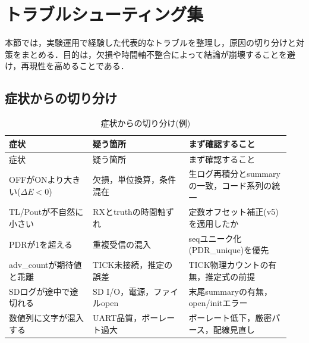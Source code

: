 ﻿%
\section{トラブルシューティング集}
\label{sec:troubleshooting}

本節では，実験運用で経験した代表的なトラブルを整理し，原因の切り分けと対策をまとめる．目的は，欠損や時間軸不整合によって結論が崩壊することを避け，再現性を高めることである．

\subsection{症状からの切り分け}
\begin{longtable}{p{0.28\linewidth}p{0.32\linewidth}p{0.34\linewidth}}
  \caption{症状からの切り分け(例)}\label{tab:troubleshooting_by_symptom}\\
  \toprule
  症状 & 疑う箇所 & まず確認すること \\
  \midrule
  \endfirsthead
  \toprule
  症状 & 疑う箇所 & まず確認すること \\
  \midrule
  \endhead
  OFFがONより大きい($\Delta E<0$) & 欠損，単位換算，条件混在 & 生ログ再積分とsummaryの一致，コード系列の統一 \\
  TL/Poutが不自然に小さい & RXとtruthの時間軸ずれ & 定数オフセット補正(v5)を適用したか \\
  PDRが1を超える & 重複受信の混入 & seqユニーク化(PDR\_unique)を優先 \\
  adv\_countが期待値と乖離 & TICK未接続，推定の誤差 & TICK物理カウントの有無，推定式の前提 \\
  SDログが途中で途切れる & SD I/O，電源，ファイルopen & 末尾summaryの有無，open/initエラー \\
  数値列に文字が混入する & UART品質，ボーレート過大 & ボーレート低下，厳密パース，配線見直し \\
  \bottomrule
\end{longtable}

